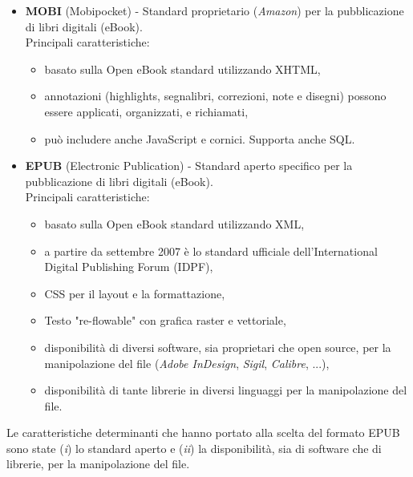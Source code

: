 \begin{itemize}
    \item \textbf{MOBI} (Mobipocket) - Standard proprietario (\textit{Amazon}) per la pubblicazione di libri digitali (eBook).\\
    Principali caratteristiche:
    \begin{itemize}
        \item basato sulla Open eBook standard utilizzando XHTML,
        \item annotazioni (highlights, segnalibri, correzioni, note e disegni) possono essere applicati, organizzati, e richiamati,
        \item può includere anche JavaScript e cornici. Supporta anche SQL.
    \end{itemize}
    \item \textbf{EPUB} (Electronic Publication) - Standard aperto specifico per la pubblicazione di libri digitali (eBook).\\
    Principali caratteristiche:
    \begin{itemize}
        \item basato sulla Open eBook standard utilizzando XML,
        \item a partire da settembre 2007 è lo standard ufficiale dell'International Digital Publishing Forum (IDPF),
        \item CSS per il layout e la formattazione,
        \item Testo "re-flowable" con grafica raster e vettoriale,
        \item disponibilità di diversi software, sia proprietari che open source, per la manipolazione del file (\textit{Adobe InDesign}, \textit{Sigil}, \textit{Calibre}, ...),
        \item disponibilità di tante librerie in diversi linguaggi per la manipolazione del file.
    \end{itemize}
\end{itemize}
Le caratteristiche determinanti che hanno portato alla scelta del formato EPUB sono state (\textit{i}) lo standard aperto e (\textit{ii}) la disponibilità, sia di software che di librerie, per la manipolazione del file. 
